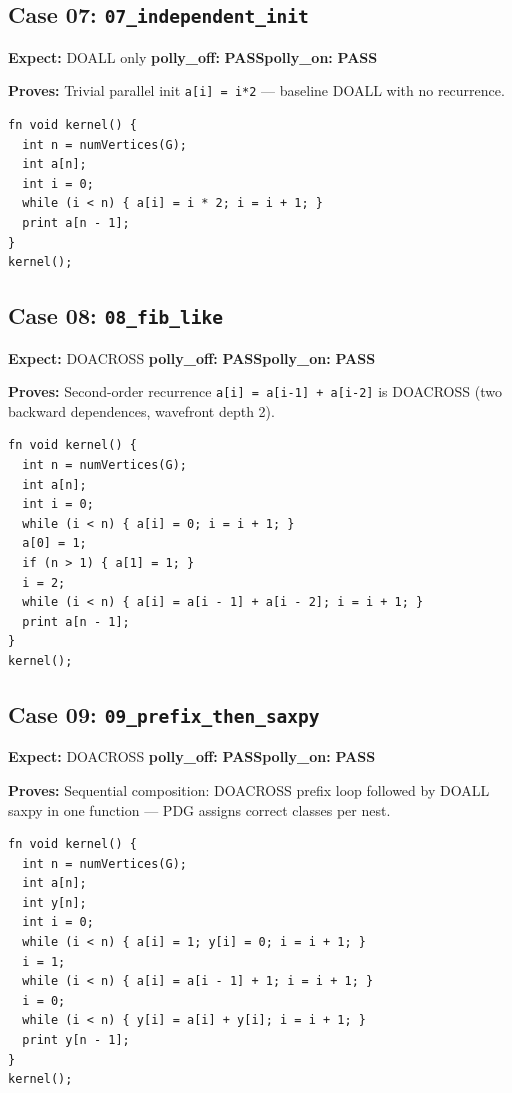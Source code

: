 \documentclass[11pt,a4paper]{article}
\newcommand{\passmark}{\textcolor{pass}{\textbf{PASS}}}
\begin{document}
\subsection{Case 07: \texttt{07\_independent\_init}}
\textbf{Expect:} DOALL only \quad \textbf{polly\_off:} \passmark \quad \textbf{polly\_on:} \passmark

\textbf{Proves:} Trivial parallel init \texttt{a[i] = i*2} --- baseline DOALL
with no recurrence.

\begin{lstlisting}
fn void kernel() {
  int n = numVertices(G);
  int a[n];
  int i = 0;
  while (i < n) { a[i] = i * 2; i = i + 1; }
  print a[n - 1];
}
kernel();
\end{lstlisting}

\subsection{Case 08: \texttt{08\_fib\_like}}
\textbf{Expect:} DOACROSS \quad \textbf{polly\_off:} \passmark \quad \textbf{polly\_on:} \passmark

\textbf{Proves:} Second-order recurrence \texttt{a[i] = a[i-1] + a[i-2]} is
DOACROSS (two backward dependences, wavefront depth 2).

\begin{lstlisting}
fn void kernel() {
  int n = numVertices(G);
  int a[n];
  int i = 0;
  while (i < n) { a[i] = 0; i = i + 1; }
  a[0] = 1;
  if (n > 1) { a[1] = 1; }
  i = 2;
  while (i < n) { a[i] = a[i - 1] + a[i - 2]; i = i + 1; }
  print a[n - 1];
}
kernel();
\end{lstlisting}

\subsection{Case 09: \texttt{09\_prefix\_then\_saxpy}}
\textbf{Expect:} DOACROSS \quad \textbf{polly\_off:} \passmark \quad \textbf{polly\_on:} \passmark

\textbf{Proves:} Sequential composition: DOACROSS prefix loop followed by DOALL
saxpy in one function --- PDG assigns correct classes per nest.

\begin{lstlisting}
fn void kernel() {
  int n = numVertices(G);
  int a[n];
  int y[n];
  int i = 0;
  while (i < n) { a[i] = 1; y[i] = 0; i = i + 1; }
  i = 1;
  while (i < n) { a[i] = a[i - 1] + 1; i = i + 1; }
  i = 0;
  while (i < n) { y[i] = a[i] + y[i]; i = i + 1; }
  print y[n - 1];
}
kernel();
\end{lstlisting}
\end{document}
